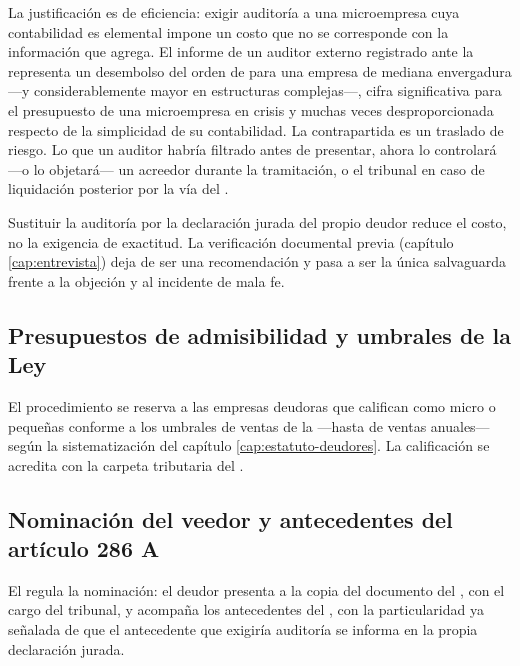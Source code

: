 La justificación es de eficiencia: exigir auditoría a una microempresa cuya contabilidad es
elemental impone un costo que no se corresponde con la información que agrega. El informe de un
auditor externo registrado ante la \cmf{} representa un desembolso del orden de
 para una empresa de mediana envergadura ---y considerablemente mayor en
estructuras complejas---, cifra significativa para el presupuesto de una microempresa en crisis y
muchas veces desproporcionada respecto de la simplicidad de su contabilidad. La contrapartida es un
traslado de riesgo. Lo que un auditor habría filtrado antes de presentar, ahora lo controlará ---o lo
objetará--- un acreedor durante la tramitación, o el tribunal en caso de liquidación posterior
por la vía del .

\begin{foco}
Sustituir la auditoría por la declaración jurada del propio deudor reduce el costo, no la
exigencia de exactitud. La verificación documental previa (capítulo \ref{cap:entrevista})
deja de ser una recomendación y pasa a ser la única salvaguarda frente a la objeción y al
incidente de mala fe.
\end{foco}

\bloqueNormativo

\subsection{Presupuestos de admisibilidad y umbrales de la Ley }

El procedimiento se reserva a las empresas deudoras que califican como micro o pequeñas
conforme a los umbrales de ventas de la \Lpyme{} \citeyearpar{ley-20416} ---hasta
 de ventas anuales--- según la sistematización del capítulo
\ref{cap:estatuto-deudores}. La calificación se acredita con la carpeta tributaria del
\sii{}.

\subsection{Nominación del veedor y antecedentes del artículo 286 A}

El  regula la nominación: el deudor presenta a la \superir{} copia del documento
del , con el cargo del tribunal, y acompaña los antecedentes del , con la
particularidad ya señalada de que el antecedente que exigiría auditoría se informa en la
propia declaración jurada.

